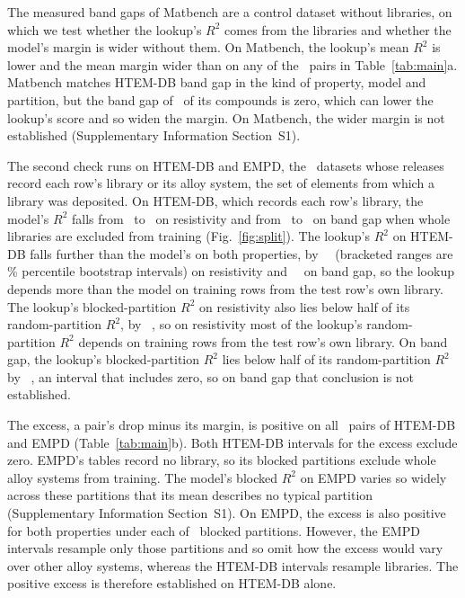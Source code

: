 \documentclass[11pt]{article}
\begin{document}
The measured band gaps of Matbench\cite{zhuo2018bandgap,dunn2020matbench} are a
control dataset without libraries, on which we test whether the lookup's $R^2$
comes from the libraries and whether the model's margin is wider without them.
On Matbench, the lookup's mean $R^2$ is lower and the mean margin wider than on
any of the \randomPairs\ pairs in Table~\ref{tab:main}a. Matbench matches HTEM-DB band gap
in the kind of property, model and partition, but the band gap of
\exptGapZeroShare\ of its compounds is zero, which can lower the lookup's score and so widen
the margin. On Matbench, the wider margin is not established (Supplementary
Information Section~S1).

\label{par:partition}
The second check runs on HTEM-DB and EMPD, the \blockedDatasets\ datasets whose
releases record each row's library or its alloy system, the set of elements from
which a library was deposited. On HTEM-DB, which records each row's library, the
model's $R^2$ falls from \htemResRandomModel\ to
\htemResBlockedModel\ on resistivity and from \htemGapRandomModel\ to
\htemGapBlockedModel\ on band gap when whole libraries are excluded from
training (Fig.~\ref{fig:split}). The lookup's $R^2$ on HTEM-DB falls further than the model's on both properties, by
\htemResFallExcess\ \htemResFallExcessCI\ (bracketed ranges are \bootstrapLevel\%
percentile bootstrap intervals) on resistivity and \htemGapFallExcess\
\htemGapFallExcessCI\ on band gap, so the lookup depends more than the model on
training rows from the test row's own library. The lookup's
blocked-partition $R^2$ on resistivity also lies below half of its
random-partition $R^2$, by \htemResBeyondHalf\ \htemResBeyondHalfCI, so on
resistivity most of the lookup's random-partition $R^2$ depends on training
rows from the test row's own library. On band gap, the lookup's blocked-partition $R^2$ lies below half of its
random-partition $R^2$ by \htemGapBeyondHalf\ \htemGapBeyondHalfCI, an interval
that includes zero, so on band gap that conclusion is not established.

The excess, a pair's drop minus its margin, is positive on all
\blockedPairs\ pairs of HTEM-DB and EMPD
(Table~\ref{tab:main}b). Both HTEM-DB intervals for the excess exclude zero. EMPD's tables record no library, so its blocked partitions exclude whole alloy
systems from training. The model's blocked $R^2$ on EMPD varies so widely across
these partitions that its mean describes no typical partition (Supplementary
Information Section~S1). On EMPD, the excess is also positive for both properties under each of
\splitDraws\ blocked partitions. However, the EMPD intervals resample only those partitions and so omit how
the excess would vary over other alloy systems, whereas the HTEM-DB intervals
resample libraries. The positive excess is therefore established on HTEM-DB
alone.
\end{document}

